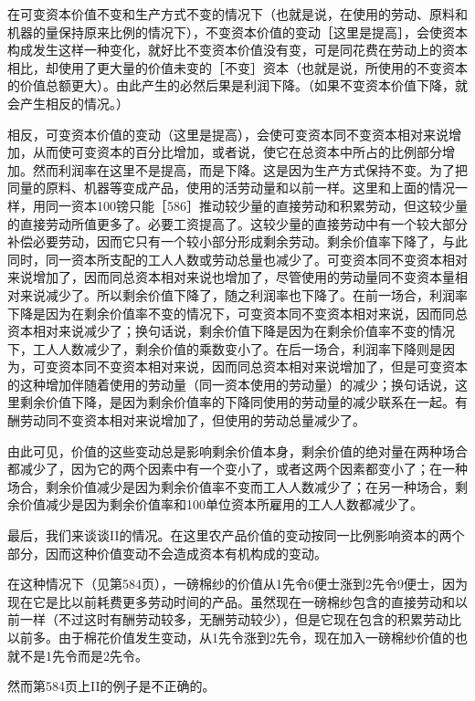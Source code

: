 在可变资本价值不变和生产方式不变的情况下（也就是说，在使用的劳动、原料和机器的量保持原来比例的情况下），不变资本价值的变动［这里是提高］，会使资本构成发生这样一种变化，就好比不变资本价值没有变，可是同花费在劳动上的资本相比，却使用了更大量的价值未变的［不变］资本（也就是说，所使用的不变资本的价值总额更大）。由此产生的必然后果是利润下降。（如果不变资本价值下降，就会产生相反的情况。）

相反，可变资本价值的变动（这里是提高），会使可变资本同不变资本相对来说增加，从而使可变资本的百分比增加，或者说，使它在总资本中所占的比例部分增加。然而利润率在这里不是提高，而是下降。这是因为生产方式保持不变。为了把同量的原料、机器等变成产品，使用的活劳动量和以前一样。这里和上面的情况一样，用同一资本100镑只能［586］推动较少量的直接劳动和积累劳动，但这较少量的直接劳动所值更多了。必要工资提高了。这较少量的直接劳动中有一个较大部分补偿必要劳动，因而它只有一个较小部分形成剩余劳动。剩余价值率下降了，与此同时，同一资本所支配的工人人数或劳动总量也减少了。可变资本同不变资本相对来说增加了，因而同总资本相对来说也增加了，尽管使用的劳动量同不变资本量相对来说减少了。所以剩余价值下降了，随之利润率也下降了。在前一场合，利润率下降是因为在剩余价值率不变的情况下，可变资本同不变资本相对来说，因而同总资本相对来说减少了；换句话说，剩余价值下降是因为在剩余价值率不变的情况下，工人人数减少了，剩余价值的乘数变小了。在后一场合，利润率下降则是因为，可变资本同不变资本相对来说，因而同总资本相对来说增加了，但是可变资本的这种增加伴随着使用的劳动量（同一资本使用的劳动量）的减少；换句话说，这里剩余价值下降，是因为剩余价值率的下降同使用的劳动量的减少联系在一起。有酬劳动同不变资本相对来说增加了，但使用的劳动总量减少了。

由此可见，价值的这些变动总是影响剩余价值本身，剩余价值的绝对量在两种场合都减少了，因为它的两个因素中有一个变小了，或者这两个因素都变小了；在一种场合，剩余价值减少是因为剩余价值率不变而工人人数减少了；在另一种场合，剩余价值减少是因为剩余价值率和100单位资本所雇用的工人人数都减少了。

最后，我们来谈谈II的情况。在这里农产品价值的变动按同一比例影响资本的两个部分，因而这种价值变动不会造成资本有机构成的变动。

在这种情况下（见第584页），一磅棉纱的价值从1先令6便士涨到2先令9便士，因为现在它是比以前耗费更多劳动时间的产品。虽然现在一磅棉纱包含的直接劳动和以前一样（不过这时有酬劳动较多，无酬劳动较少），但是它现在包含的积累劳动比以前多。由于棉花价值发生变动，从1先令涨到2先令，现在加入一磅棉纱价值的也就不是1先令而是2先令。

然而第584页上II的例子是不正确的。

